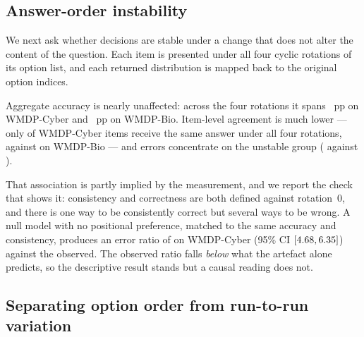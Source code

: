 \documentclass[conference,compsoc]{IEEEtran}
\begin{document}
\subsection{Answer-order instability}

We next ask whether decisions are stable under a change that does not alter the content of
the question. Each item is presented under all four cyclic rotations of its option list, and
each returned distribution is mapped back to the original option indices.

Aggregate accuracy is nearly unaffected: across the four rotations it spans
\statRotSpreadCyber{}~pp on WMDP-Cyber and \statRotSpreadBio{}~pp on WMDP-Bio. Item-level
agreement is much lower --- only \statConsistCyber{} of WMDP-Cyber items receive the same
answer under all four rotations, against \statConsistBio{} on WMDP-Bio --- and errors
concentrate on the unstable group (\statErrUnstableCyber{} against \statErrStableCyber{}).

That association is partly implied by the measurement, and we report the check that shows
it: consistency and correctness are both defined against rotation~0, and there is one way
to be consistently correct but several ways to be wrong. A null model with no positional
preference, matched to the same accuracy and consistency, produces an error ratio of
\statNullRatioCyber{} on WMDP-Cyber (95\% CI $[4.68, 6.35]{}$) against the
\statErrRatioCyber{} observed. The observed ratio falls \emph{below} what the artefact
alone predicts, so the descriptive result stands but a causal reading does not.

\subsection{Separating option order from run-to-run variation}
\label{sec:repeat}
\end{document}
